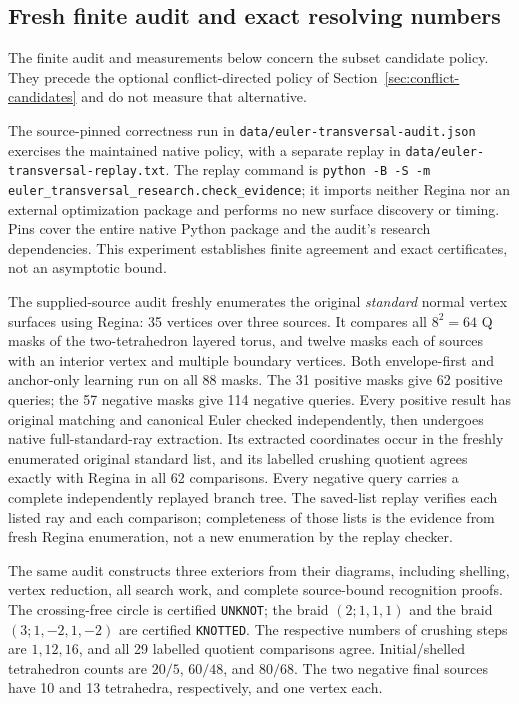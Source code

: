 \subsection{Fresh finite audit and exact resolving numbers}

The finite audit and measurements below concern the subset candidate
policy.  They precede the optional conflict-directed policy of
Section~\ref{sec:conflict-candidates} and do not measure that alternative.

The source-pinned correctness run in
\texttt{data/euler-transversal-audit.json} exercises the maintained native
policy, with a separate replay in
\texttt{data/euler-transversal-replay.txt}.  The replay command is
\texttt{python -B -S -m euler\_transversal\_research.check\_evidence};
it imports neither Regina nor an external optimization package and performs
no new surface discovery or timing.  Pins cover the entire native Python
package and the audit's research dependencies.  This experiment establishes
finite agreement and exact certificates, not an asymptotic bound.

The supplied-source audit freshly enumerates the original \emph{standard}
normal vertex surfaces using Regina: 35 vertices over three sources.  It
compares all $8^2=64$ Q masks of the two-tetrahedron layered torus, and twelve
masks each of sources with an interior vertex and multiple boundary vertices.
Both envelope-first and anchor-only learning run on all 88 masks.  The 31
positive masks give 62 positive queries; the 57 negative masks give 114
negative queries.  Every positive result has original matching and canonical
Euler checked independently, then undergoes native full-standard-ray
extraction.  Its extracted coordinates occur in the freshly enumerated
original standard list, and its labelled crushing quotient agrees exactly
with Regina in all 62 comparisons.  Every negative query carries a complete
independently replayed branch tree.  The saved-list replay verifies each
listed ray and each comparison; completeness of those lists is the evidence
from fresh Regina enumeration, not a new enumeration by the replay checker.

The same audit constructs three exteriors from their diagrams, including
shelling, vertex reduction, all search work, and complete source-bound
recognition proofs.  The crossing-free circle is certified \texttt{UNKNOT};
the braid $(2;1,1,1)$ and the braid $(3;1,-2,1,-2)$ are certified
\texttt{KNOTTED}.  The respective numbers of crushing steps are $1,12,16$,
and all 29 labelled quotient comparisons agree.  Initial/shelled tetrahedron
counts are $20/5$, $60/48$, and $80/68$.  The two negative final sources have
10 and 13 tetrahedra, respectively, and one vertex each.

